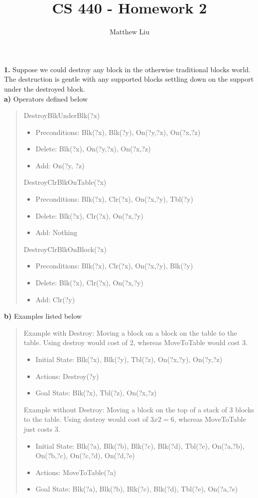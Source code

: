 \documentclass[titlepage]{article}
\title{CS 440 - Homework 2}
\author{Matthew Liu}
\date{}
\begin{document}
\maketitle{}

\noindent \textbf{1. } Suppose we could destroy any block in the otherwise traditional blocks world. The destruction is gentle with any supported blocks settling down on the support under the destroyed block.\\

\textbf{a) } Operators defined below

\begin{quote}
	DestroyBlkUnderBlk(?x)
	\begin{itemize}
		\item Preconditions: Blk(?x), Blk(?y), On(?y,?x), On(?x,?z)
		\item Delete: Blk(?x), On(?y,?x), On(?x,?z)
		\item Add: On(?y, ?z)
	\end{itemize}

	DestroyClrBlkOnTable(?x)
	\begin{itemize}
		\item Preconditions: Blk(?x), Clr(?x), On(?x,?y), Tbl(?y)
		\item Delete: Blk(?x), Clr(?x), On(?x,?y)
		\item Add: Nothing
	\end{itemize}

	DestroyClrBlkOnBlock(?x)
	\begin{itemize}
		\item Preconditions: Blk(?x), Clr(?x), On(?x,?y), Blk(?y)
		\item Delete: Blk(?x), Clr(?x), On(?x,?y)
		\item Add: Clr(?y)
	\end{itemize}
\end{quote}

\textbf{b) } Examples listed below

\begin{quote}
	Example with Destroy: Moving a block on a block on the table to the table. Using destroy would cost of $2$, whereas MoveToTable would cost $3$.
	\begin{itemize}
		\item Initial State: Blk(?x), Blk(?y), Tbl(?z), On(?x,?y), On(?y,?z)
		\item Actions: Destroy(?y)
		\item Goal State: Blk(?x), Tbl(?z), On(?x,?z)
	\end{itemize}

	Example without Destroy: Moving a block on the top of a stack of 3 blocks to the table. Using destroy would cost of $3x2=6$, whereas MoveToTable just costs $3$.
	\begin{itemize}
		\item Initial State: Blk(?a), Blk(?b), Blk(?c), Blk(?d), Tbl(?e), On(?a,?b), On(?b,?c), On(?c,?d), On(?d,?e)
		\item Actions: MoveToTable(?a)
		\item Goal State: Blk(?a), Blk(?b), Blk(?c), Blk(?d), Tbl(?e), On(?a,?e)
	\end{itemize}
\end{quote}
\end{document}
